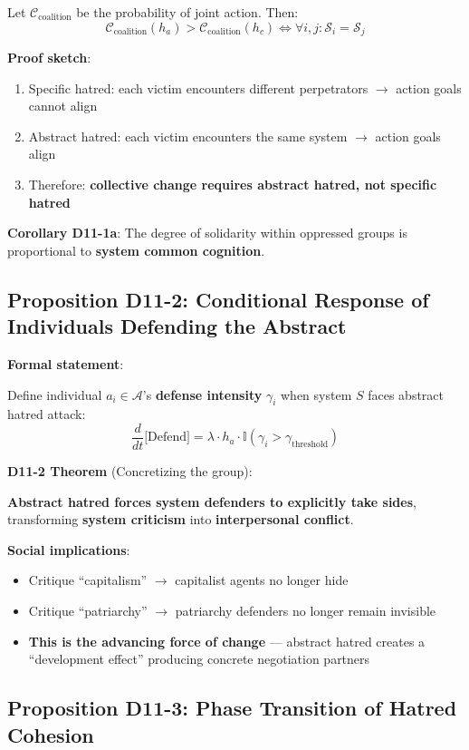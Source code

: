 \documentclass[12pt,a4paper]{article}
\newcommand{\calA}{\mathcal{A}}
\newcommand{\calS}{\mathcal{S}}
\newcommand{\calC}{\mathcal{C}}
\begin{document}
Let $\calC_{\text{coalition}}$ be the probability of joint action. Then:
$$\calC_{\text{coalition}}(h_a) > \calC_{\text{coalition}}(h_c) \iff \forall i, j: \calS_i = \calS_j$$

\textbf{Proof sketch}:
\begin{enumerate}
    \item Specific hatred: each victim encounters different perpetrators $\to$ action goals cannot align
    \item Abstract hatred: each victim encounters the same system $\to$ action goals align
    \item Therefore: \textbf{collective change requires abstract hatred, not specific hatred}
\end{enumerate}

\textbf{Corollary D11-1a}: The degree of solidarity within oppressed groups is proportional to \textbf{system common cognition}.

\subsection{Proposition D11-2: Conditional Response of Individuals Defending the Abstract}

\textbf{Formal statement}:

Define individual $a_i \in \calA$'s \textbf{defense intensity} $\gamma_i$ when system $S$ faces abstract hatred attack:
$$\frac{d}{dt} \text{[Defend]} = \lambda \cdot h_a \cdot \mathbb{I}(\gamma_i > \gamma_{\text{threshold}})$$

\textbf{D11-2 Theorem} (Concretizing the group):

\textbf{Abstract hatred forces system defenders to explicitly take sides}, transforming \textbf{system criticism} into \textbf{interpersonal conflict}.

\textbf{Social implications}:
\begin{itemize}
    \item Critique ``capitalism'' $\to$ capitalist agents no longer hide
    \item Critique ``patriarchy'' $\to$ patriarchy defenders no longer remain invisible
    \item \textbf{This is the advancing force of change} — abstract hatred creates a ``development effect'' producing concrete negotiation partners
\end{itemize}

\subsection{Proposition D11-3: Phase Transition of Hatred Cohesion}
\end{document}
